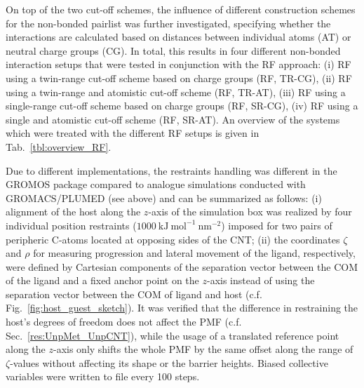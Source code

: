 \documentclass[9pt,lessons,pubversion]{livecoms}
\begin{document}
On top of the two cut-off schemes, the influence of different construction schemes for the non-bonded pairlist was further investigated, 
specifying whether the interactions are calculated based on distances between individual atoms (AT) or neutral charge groups (CG).
In total, this results in four different non-bonded interaction setups that were tested in conjunction with the RF approach:
(i) RF using a twin-range cut-off scheme based on charge groups (RF, TR-CG),
(ii) RF using a twin-range and atomistic cut-off scheme (RF, TR-AT),
(iii) RF using a single-range cut-off scheme based on charge groups (RF, SR-CG),
(iv) RF using a single and atomistic cut-off scheme (RF, SR-AT).
An overview of the systems which were treated with the different RF setups is given in Tab.~\ref{tbl:overview_RF}.

Due to different implementations, the restraints handling was different in the GROMOS package compared to analogue simulations conducted with GROMACS/PLUMED (see above) and can be summarized as follows:
(i) alignment of the host along the $z$-axis of the simulation box was realized by four individual position restraints ($1000~\mathrm{kJ~mol}^{-1}~\mathrm{nm}^{-2}$) imposed for two pairs of peripheric C-atoms 
located at opposing sides of the CNT;
(ii) the coordinates $\zeta$ and $\rho$  for measuring progression and lateral movement of the ligand, respectively, were defined by Cartesian components of the separation vector between the COM of the ligand and a fixed anchor point on the $z$-axis instead of using the separation vector between the COM of ligand and host (c.f. Fig.~\ref{fig:host_guest_sketch}).
It was verified that the difference in restraining the host's degrees of freedom does not affect the PMF (c.f. Sec.~\ref{res:UnpMet_UnpCNT}), 
while the usage of a translated reference point along the $z$-axis only shifts the whole PMF by the same offset along the range of $\zeta$-values without affecting its shape or the barrier heights. 
Biased collective variables were written to file every 100 steps.
\end{document}
